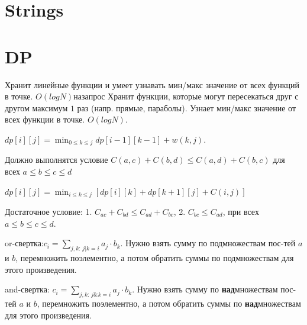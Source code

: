 \documentclass[a4paper,10pt,twocolumn,oneside]{article}
\begin{document}
\section{Strings}


\section{DP}
{Хранит линейные функции и умеет узнавать мин/макс значение от всех функций в точке. $O(logN) на запрос$}
{Хранит функции, которые могут пересекаться друг с другом максимум $1$ раз (напр. прямые, параболы). Узнает мин/макс значение от всех функции в точке. $O(logN)$.} %
{$dp[i][j] = \min_{0 \leq k \leq j} dp[i - 1][k - 1] + w(k, j)$. 

Должно выполнятся условие $C(a,c) + C(b,d) \leq  C(a, d) + C(b, c)$ для всех $a \leq b \leq c \leq d$} 
{$dp[i][j] = \min_{i \leq k \leq j}[dp[i][k] + dp[k + 1][j] + C(i, j)]$

Достаточное условие: 1. $C_{ac}+C_{bd}\le C_{ad}+C_{bc}$, 2. $C_{bc}\le C_{ad}$, при всех $a\le b\le c\le d$.}
{or-свертка:$c_i = \sum_{j,k:\,j | k = i} a_j \cdot b_k$. Нужно взять сумму по подмножествам пос-тей $a$ и $b$, перемножить поэлементно, а потом обратить суммы по подмножествам для этого произведения.

and-свертка: $c_i = \sum_{j,k:\,j \& k = i} a_j \cdot b_k$. Нужно взять сумму по \textbf{над}множествам пос-тей $a$ и $b$, перемножить поэлементно, а потом обратить суммы по \textbf{над}множествам для этого произведения.}
\end{document}
